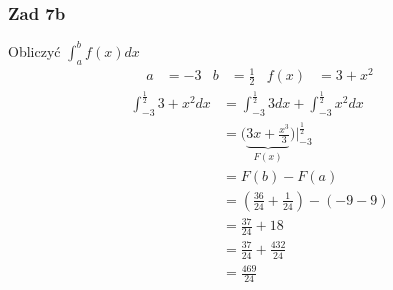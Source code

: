 \documentclass[11pt]{article}
\begin{document}
\subsubsection{Zad 7b}
\label{sec:org0d41e7b}
Obliczyć \(\displaystyle\int_a^b f(x) dx\)
\begin{align*}
a &= -3 & b &= \frac{1}{2} & f(x)&=3+x^2
\end{align*}
\begin{align*}
  \int_{-3}^\frac{1}{2} 3 + x^2 dx
  &= \int_{-3}^{\frac{1}{2}}3 dx + \int_{-3}^{\frac{1}{2}} x^{2} dx
  \\
  &= \Big ( \underbrace{ 3x + \frac{x^{3}}{3} }_{F(x)} \Big) \Bigg|_{-3}^{\frac{1}{2}}
  \\
  &= F(b) - F(a)
  \\
  &= \left(\frac{36}{24} + \frac{1}{24} \right) - (-9 -9)
  \\
  &= \frac{37}{24} + 18
  \\
  &= \frac{37}{24} + \frac{432}{24}
  \\
  &=\frac{469}{24}
\end{align*}
\end{document}
